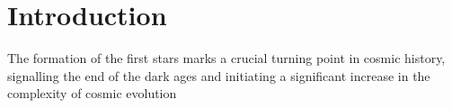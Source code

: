 \section{Introduction}
\label{intro}

The formation of the first stars marks a crucial turning point in cosmic history, signalling the end of the dark ages and initiating a significant increase in the complexity of cosmic evolution \cite{Barkana_2001}

